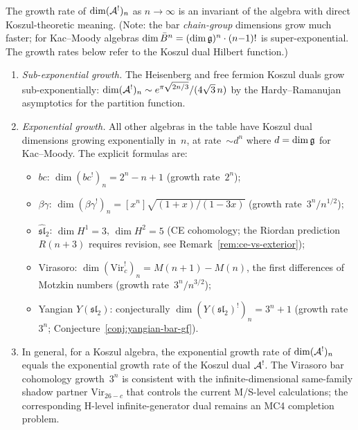 \begin{remark}\label{rem:bar-growth-koszul}
The growth rate of $\dim (\mathcal{A}^!)_n$ as $n \to \infty$ is
an invariant of the algebra with direct Koszul-theoretic meaning.
(Note: the bar \emph{chain-group} dimensions grow much faster;
for Kac--Moody algebras $\dim \bar{B}^n = (\dim\mathfrak{g})^n \cdot (n{-}1)!$
is super-exponential.  The growth rates below refer to
the Koszul dual Hilbert function.)
\begin{enumerate}
\item \emph{Sub-exponential growth.}
  The Heisenberg and free fermion Koszul duals grow
  sub-exponentially: $\dim (\mathcal{A}^!)_n \sim
  e^{\pi\sqrt{2n/3}}/(4\sqrt{3}\,n)$ by the
  Hardy--Ramanujan asymptotics for the partition function.
\item \emph{Exponential growth.}
  All other algebras in the table have Koszul dual dimensions growing
  exponentially in~$n$, at rate~$\sim d^n$ where $d = \dim\mathfrak{g}$
  for Kac--Moody.
  The explicit formulas are:
  \begin{itemize}
  \item $bc$: $\dim (bc^!)_n = 2^n - n + 1$
    (growth rate~$2^n$);
  \item $\beta\gamma$: $\dim (\beta\gamma^!)_n = [x^n]\sqrt{(1{+}x)/(1{-}3x)}$
    (growth rate~$3^n/n^{1/2}$);
  \item $\widehat{\mathfrak{sl}}_2$:
    $\dim H^1 = 3$, $\dim H^2 = 5$ (CE cohomology;
    the Riordan prediction $R(n{+}3)$ requires revision,
    see Remark~\ref{rem:ce-vs-exterior});
  \item Virasoro: $\dim (\mathrm{Vir}_c^!)_n = M(n{+}1) - M(n)$,
    the first differences of Motzkin numbers
    (growth rate~$3^n/n^{3/2}$);
  \item Yangian $Y(\mathfrak{sl}_2)$: conjecturally
    $\dim (Y(\mathfrak{sl}_2)^!)_n = 3^n + 1$ (growth rate~$3^n$;
    Conjecture~\ref{conj:yangian-bar-gf}).
  \end{itemize}
\item In general, for a Koszul algebra, the exponential
  growth rate of $\dim (\mathcal{A}^!)_n$ equals the
  exponential growth rate of the Koszul dual $\mathcal{A}^!$.
  The Virasoro bar cohomology growth~$3^n$ is consistent
  with the infinite-dimensional same-family shadow partner
  $\mathrm{Vir}_{26-c}$ that controls the current M/S-level
  calculations; the corresponding H-level infinite-generator dual
  remains an MC4 completion problem.
\end{enumerate}
\end{remark}

